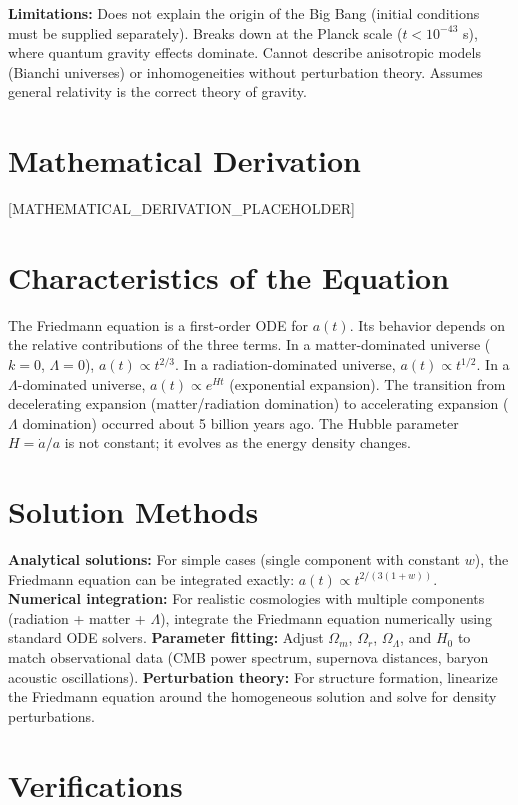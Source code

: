 \documentclass[11pt,openright]{book}
\begin{document}
\textbf{Limitations:} Does not explain the origin of the Big Bang (initial conditions must be supplied separately). Breaks down at the Planck scale ($t < 10^{-43}$ s), where quantum gravity effects dominate. Cannot describe anisotropic models (Bianchi universes) or inhomogeneities without perturbation theory. Assumes general relativity is the correct theory of gravity.


\section*{Mathematical Derivation}

[MATHEMATICAL_DERIVATION_PLACEHOLDER]

\section*{Characteristics of the Equation}

The Friedmann equation is a first-order ODE for $a(t)$. Its behavior depends on the relative contributions of the three terms. In a matter-dominated universe ($k = 0$, $\Lambda = 0$), $a(t) \propto t^{2/3}$. In a radiation-dominated universe, $a(t) \propto t^{1/2}$. In a $\Lambda$-dominated universe, $a(t) \propto e^{Ht}$ (exponential expansion). The transition from decelerating expansion (matter/radiation domination) to accelerating expansion ($\Lambda$ domination) occurred about 5 billion years ago. The Hubble parameter $H = \dot{a}/a$ is not constant; it evolves as the energy density changes.
\section*{Solution Methods}

\textbf{Analytical solutions:} For simple cases (single component with constant $w$), the Friedmann equation can be integrated exactly: $a(t) \propto t^{2/(3(1+w))}$. \textbf{Numerical integration:} For realistic cosmologies with multiple components (radiation + matter + $\Lambda$), integrate the Friedmann equation numerically using standard ODE solvers. \textbf{Parameter fitting:} Adjust $\Omega_m$, $\Omega_r$, $\Omega_\Lambda$, and $H_0$ to match observational data (CMB power spectrum, supernova distances, baryon acoustic oscillations). \textbf{Perturbation theory:} For structure formation, linearize the Friedmann equation around the homogeneous solution and solve for density perturbations.
\section*{Verifications}
\end{document}
